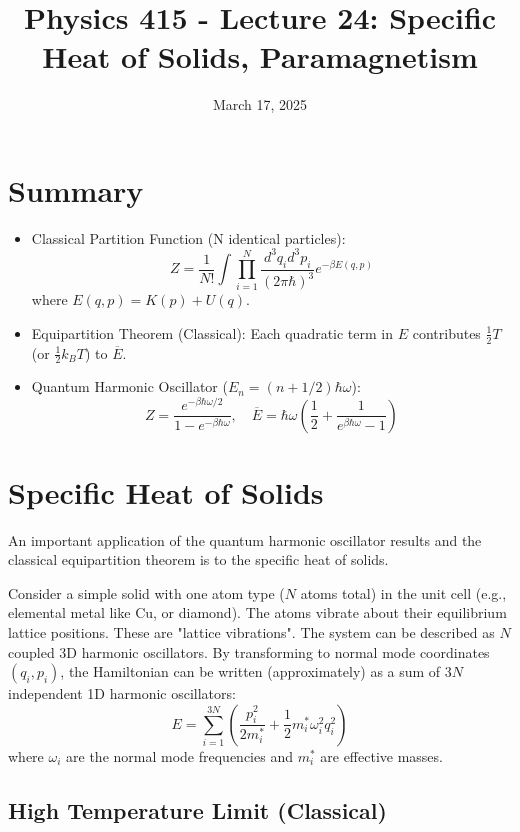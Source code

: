 \documentclass[11pt]{article}
\title{Physics 415 - Lecture 24: Specific Heat of Solids, Paramagnetism}
\date{March 17, 2025}
\author{} %
\newcommand{\avg}[1]{\overline{#1}}
\newcommand{\kb}{k_B} %
\newcommand{\partfn}{Z} %
\begin{document}
\maketitle
\thispagestyle{empty}

\section*{Summary}

\begin{itemize}
    \item Classical Partition Function (N identical particles):
    \[ \partfn = \frac{1}{N!} \int \prod_{i=1}^N \frac{d^3 q_i d^3 p_i}{(2\pi\hbar)^3} e^{-\beta E(q,p)} \]
    where $E(q,p) = K(p) + U(q)$.
    \item Equipartition Theorem (Classical): Each quadratic term in $E$ contributes $\frac{1}{2}T$ (or $\frac{1}{2}\kb T$) to $\avg{E}$.
    \item Quantum Harmonic Oscillator ($E_n = (n+1/2)\hbar\omega$):
    \[ \partfn = \frac{e^{-\beta\hbar\omega/2}}{1-e^{-\beta\hbar\omega}}, \quad \avg{E} = \hbar\omega \left( \frac{1}{2} + \frac{1}{e^{\beta\hbar\omega}-1} \right) \]
\end{itemize}

\section*{Specific Heat of Solids}

An important application of the quantum harmonic oscillator results and the classical equipartition theorem is to the specific heat of solids.

Consider a simple solid with one atom type ($N$ atoms total) in the unit cell (e.g., elemental metal like Cu, or diamond). The atoms vibrate about their equilibrium lattice positions. These are "lattice vibrations".
The system can be described as $N$ coupled 3D harmonic oscillators. By transforming to normal mode coordinates $(q_i, p_i)$, the Hamiltonian can be written (approximately) as a sum of $3N$ independent 1D harmonic oscillators:
\[ E = \sum_{i=1}^{3N} \left( \frac{p_i^2}{2m_i^*} + \frac{1}{2} m_i^* \omega_i^2 q_i^2 \right) \]
where $\omega_i$ are the normal mode frequencies and $m_i^*$ are effective masses.

\subsection*{High Temperature Limit (Classical)}
\end{document}
